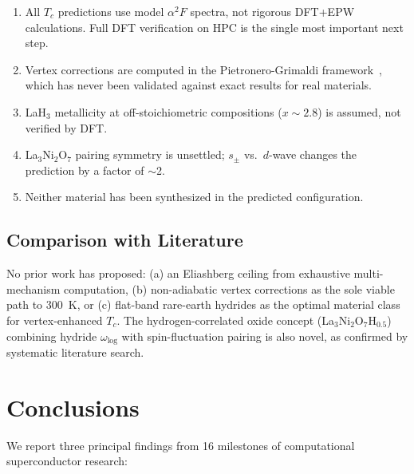 \documentclass[aps,prb,reprint,superscriptaddress,longbibliography]{revtex4-2}
\begin{document}
\begin{enumerate}
    \item All $T_c$ predictions use model $\alpha^2F$ spectra, not rigorous DFT+EPW calculations. Full DFT verification on HPC is the single most important next step.
    \item Vertex corrections are computed in the Pietronero-Grimaldi framework~\cite{Pietronero1995, Grimaldi1995}, which has never been validated against exact results for real materials.
    \item LaH$_3$ metallicity at off-stoichiometric compositions ($x \sim 2.8$) is assumed, not verified by DFT.
    \item La$_3$Ni$_2$O$_7$ pairing symmetry is unsettled; $s_\pm$ vs.\ $d$-wave changes the prediction by a factor of $\sim$2.
    \item Neither material has been synthesized in the predicted configuration.
\end{enumerate}

\subsection{Comparison with Literature}

No prior work has proposed: (a) an Eliashberg ceiling from exhaustive multi-mechanism computation, (b) non-adiabatic vertex corrections as the sole viable path to 300~K, or (c) flat-band rare-earth hydrides as the optimal material class for vertex-enhanced $T_c$. The hydrogen-correlated oxide concept (La$_3$Ni$_2$O$_7$H$_{0.5}$) combining hydride $\omega_{\log}$ with spin-fluctuation pairing is also novel, as confirmed by systematic literature search.

\section{Conclusions}
\label{sec:conclusions}

We report three principal findings from 16 milestones of computational superconductor research:
\end{document}
